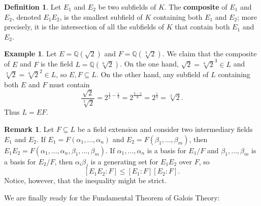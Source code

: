\documentclass[12pt]{report}
\numberwithin{equation}{section}
\numberwithin{theorem}{chapter}
\theoremstyle{definition}
\newtheorem{definition}[theorem]{Definition}
\newtheorem{example}[theorem]{Example}
\newtheorem*{basic properties}{Basic Properties}
\newtheorem*{Important Remark}{Important Remark}
\newtheorem{remark}[theorem]{Remark}
\begin{document}
\begin{definition}
	Let $E_1$ and $E_2$ be two subfields of $K$. The {\bf composite} of $E_1$ and $E_2$, denoted $E_1 E_2$, is the smallest subfield of $K$ containing both $E_1$ and $E_2$; more precisely, it is the intersection of all the subfields of $K$ that contain both $E_1$ and $E_2$.
\end{definition}


\begin{example}
	Let $E = \mathbb{Q}(\sqrt{2})$ and $F = \mathbb{Q}(\sqrt[3]{2})$. We claim that the composite of $E$ and $F$ is the field $L = \mathbb{Q}(\sqrt[6]{2})$. On the one hand, $\sqrt{2} = \sqrt[6]{2}^3 \in L$ and $\sqrt[3]{2} = \sqrt[6]{2}^2 \in L$, so $E, F \subseteq L$. On the other hand, any subfield of $L$ containing both $E$ and $F$ must contain
	$$\frac{\sqrt{2}}{\sqrt[3]{2}} = 2^{\frac{1}{2} - \frac{1}{3}} = 2^{\frac{3-2}{6}} = 2^{\frac{1}{3}} = \sqrt[3]{2}.$$
	Thus $L = EF$.
\end{example}


\begin{remark}
	Let $F \subseteq L$ be a field extension and consider two intermediary fields $E_1$ and $E_2$. If $E_1 = F(\alpha_1, \ldots, \alpha_n)$ and $E_2 = F(\beta_1, \ldots, \beta_m)$, then $E_1 E_2 = F(\alpha_1, \ldots, \alpha_n, \beta_1, \ldots, \beta_m)$. If $\alpha_1, \ldots, \alpha_n$ is a basis for $E_1/F$ and  $\beta_1, \ldots, \beta_m$ is a basis for $E_2/F$, then $\alpha_i \beta_j$ is a generating set for $E_1E_2$ over $F$, so
	$$[E_1 E_2 : F] \leqslant [E_1 : F][E_2 : F].$$
	Notice, however, that the inequality might be strict.
\end{remark}

We are finally ready for the Fundamental Theorem of Galois Theory:
\end{document}
